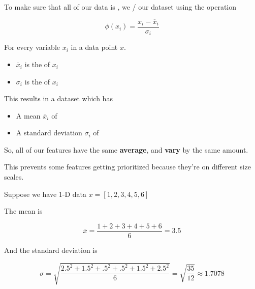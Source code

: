                 \begin{definition}
                    To make sure that all of our data is , we / our dataset using the operation

                    \begin{equation*}
                        \phi(x_i) = \frac{x_i - \overline{x}_i}{\sigma_i}
                    \end{equation*}

                    For every variable $x_i$ in a data point $x$.

                    \begin{itemize}
                        \item $\overline{x}_i$ is the  of $x_i$
                        \item $\sigma_i$ is the  of $x_i$
                    \end{itemize}

                    This results in a dataset which has 
    
                    \begin{itemize}
                        \item A mean $\overline{x}_i$ of 
                        \item A standard deviation $\sigma_i$ of 
                    \end{itemize}
                \end{definition}

                So, all of our features have the same \textbf{average}, and \textbf{vary} by the same amount. 

                This prevents some features getting prioritized because they're on different size scales.

                \miniex Suppose we have 1-D data $x=[1,2,3,4,5,6]$

                The mean is 

                \begin{equation}
                    \overline{x} = \frac{1+2+3+4+5+6}{6} = 3.5
                \end{equation}

                And the standard deviation is 

                \begin{equation}
                    \sigma = \sqrt{\frac{2.5^2+1.5^2+.5^2+.5^2+1.5^2+2.5^2}{6}}
                    = \sqrt{\frac{35}{12}} \approx 1.7078
                \end{equation}

